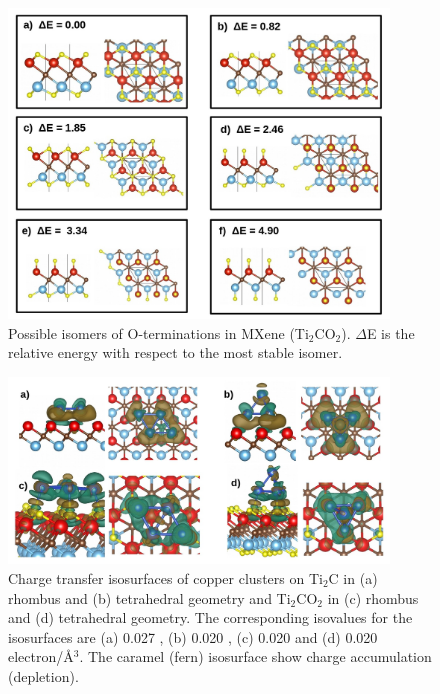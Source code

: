 \begin{figure}[htb]
  \begin{center}
    \includegraphics[width=0.9\textwidth]{./Appendix2/Appendix2_figures/photo1.jpg}
  \end{center}
    \caption{Possible isomers of O-terminations in MXene (Ti$_2$CO$_2$). $\Delta$E is the relative energy with respect to the most stable isomer. }
  \label{fig-01}
\end{figure}

\begin{figure}[htb]
  \begin{center}
    \includegraphics[width=0.9\textwidth]{./Appendix2/Appendix2_figures/figure5.jpg}
  \end{center}
\caption{Charge transfer isosurfaces of copper clusters on Ti$_2$C in (a) rhombus and (b) tetrahedral geometry and Ti$_2$CO$_2$ in (c) rhombus and (d) tetrahedral geometry. The corresponding isovalues for the isosurfaces are (a) 0.027 , (b) 0.020 , (c) 0.020  and (d) 0.020  electron/Å$^3$. The caramel (fern) isosurface show charge accumulation (depletion).}
  \label{fig-05}
\end{figure}

